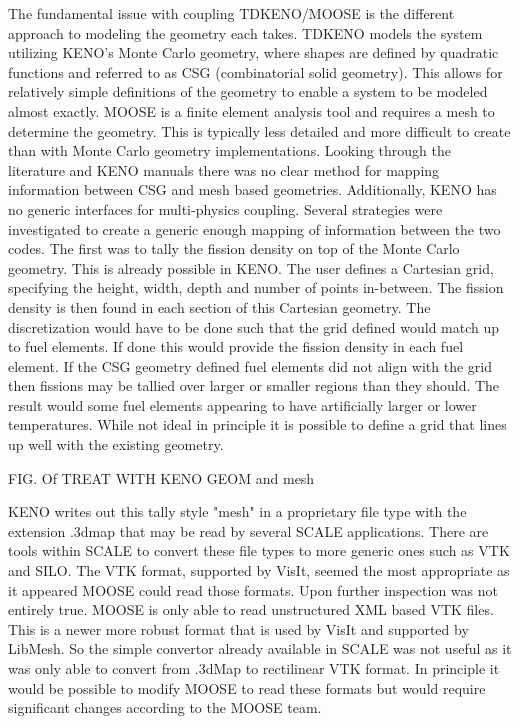 \documentclass[11pt]{article}
\begin{document}
The fundamental issue with coupling TDKENO/MOOSE is the different approach to modeling the geometry each takes.  TDKENO models the system utilizing KENO's Monte Carlo geometry, where shapes are defined by quadratic functions and referred to as CSG (combinatorial solid geometry). This allows for relatively simple definitions of the geometry to enable a system to be modeled almost exactly. MOOSE is a finite element analysis tool and requires a mesh to determine the geometry.  This is typically less detailed and more difficult to create than with Monte Carlo geometry implementations.  Looking through the literature and KENO manuals there was no clear method for mapping information between CSG and mesh based geometries.  Additionally, KENO has no generic interfaces for multi-physics coupling.  Several strategies were investigated to create a generic enough mapping of information between the two codes. 
The first was to tally the fission density on top of the Monte Carlo geometry.  This is already possible in KENO.  The user defines a Cartesian grid, specifying the height, width, depth and number of points in-between.   The fission density is then found in each section of this Cartesian geometry.  The discretization would have to be done such that the grid defined would match up to fuel elements.  If done this would provide the fission density in each fuel element.  If the CSG geometry defined fuel elements did not align with the grid then fissions may be tallied over larger or smaller regions than they should.  The result would some fuel elements appearing to have artificially larger or lower temperatures.  While not ideal in principle it is possible to define a grid that lines up well with the existing geometry.  

FIG. Of TREAT WITH KENO GEOM and mesh 

KENO writes out this tally style "mesh" in a proprietary file type with the extension .3dmap that may be read by several SCALE applications.  There are tools within SCALE to convert these file types to more generic ones such as VTK and SILO.  The VTK format, supported by VisIt, seemed the most appropriate as it appeared MOOSE could read those formats.  Upon further inspection was not entirely true. MOOSE is only able to read unstructured XML based VTK files.  This is a newer more robust format that is used by VisIt and supported by LibMesh.  So the simple convertor already available in SCALE was not useful as it was only able to convert from .3dMap to rectilinear VTK format.  In principle it would be possible to modify MOOSE to read these formats but would require significant changes according to the MOOSE team.  
\end{document}
